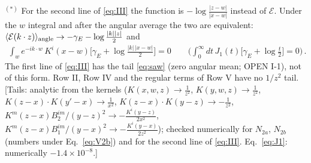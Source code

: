 \documentclass[9pt]{article}
\numberwithin{equation}{section}
\begin{document}
$^{(*)}$ For the second line of \eqref{eq:III} the function is $-\log\frac{|z-w|}{|x-w|}$ instead of $\mathcal{E}$. Under the $w$ integral and after the angular average the two are equivalent: $\langle\mathcal{E}(k\cdot z)\rangle_{\rm angle}\to-\gamma_{E}-\log\frac{|k||z|}{2}$ and
\begin{align}
\int_{w}e^{-ik\cdot w}\,K^{i}(x-w)\Big[\gamma_{E}+\log\frac{|k|\,|x-w|}{2}\Big]=0\qquad\Big(\int_{0}^{\infty}dt\,J_{1}(t)\Big[\gamma_{E}+\log\frac{t}{2}\Big]=0\Big)\,.\label{eq:J1}
\end{align}
The first line of \eqref{eq:III} has the tail \eqref{eq:saw} (zero angular mean; {\color{magenta}OPEN I-1}), not of this form. Row II, Row IV and the regular terms of Row V have no $1/z^{2}$ tail.
{\color{gray}\small [Tails: analytic from the kernels ($K(x,w,z)\to\frac{1}{z^{2}}$, $K(y,w,z)\to\frac{1}{z^{2}}$, $K(z-x)\cdot K(y'-x)\to\frac{1}{x^{2}}$, $K(z-x)\cdot K(y-z)\to-\frac{1}{z^{2}}$, $K^{m}(z-x)B_{2}^{im}/(y-z)^{2}\to-\frac{K^{i}(y-z)}{2x^{2}}$, $K^{m}(z-x)B_{1}^{im}/(y-x)^{2}\to-\frac{K^{i}(y-x)}{2z^{2}}$); checked numerically for $N_{2a}$, $N_{2b}$ (numbers under Eq.~\eqref{eq:V2b}) and for the second line of \eqref{eq:III}. Eq.~\eqref{eq:J1}: numerically $-1.4\times10^{-8}$.]}
\end{document}
